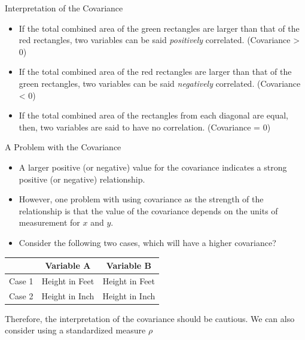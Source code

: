 \documentclass{beamer}
\begin{document}
\begin{frame}{Interpretation of the Covariance}
\begin{itemize}
\item If the total combined area of the green rectangles are larger than that of the red rectangles, two variables can be said \textit{positively} correlated. (Covariance > 0)

\item If the total combined area of the red rectangles are larger than that of the green rectangles, two variables can be said \textit{negatively} correlated. (Covariance < 0)

\item If the total combined area of the rectangles from  each diagonal are equal, then, two variables are said to have no correlation.  (Covariance = 0)


\end{itemize}
\end{frame}


\begin{frame}{A Problem with the Covariance}

\begin{itemize}
\item A larger positive (or negative) value for the covariance indicates a strong positive (or negative) relationship.
\item However, one problem with using covariance as the strength of the relationship is that the value of the covariance depends on the units of measurement for $x$ and $y$. 
\item Consider the following two cases, which will have a higher covariance? 

\end{itemize}


\begin{center}
\begin{tabular}{c|c|c}
\hline 
 & Variable A & Variable B \\ 
\hline 
Case 1 & Height in Feet & Height in Feet \\ 
\hline 
Case 2 & Height in Inch & Height in Inch \\ 
\hline 
\end{tabular}
\end{center}

Therefore, the interpretation of the covariance should be cautious. We can also consider using a standardized measure $\rho$

\end{frame}
\end{document}
